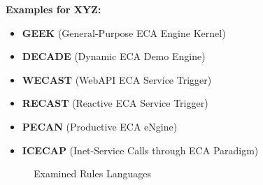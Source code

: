 \documentclass[11pt]{article}%
\begin{document}
\newpage




\textbf{Examples for XYZ:}
\begin{itemize}
  \item \textbf{GEEK} (General-Purpose ECA Engine Kernel)
  \item \textbf{DECADE} (Dynamic ECA Demo Engine)
  \item \textbf{WECAST} (WebAPI ECA Service Trigger)
  \item \textbf{RECAST} (Reactive ECA Service Trigger)
  \item \textbf{PECAN} (Productive ECA eNgine)
  \item \textbf{ICECAP} (Inet-Service Calls through ECA Paradigm)
\end{itemize}




\newpage
\begin{figure}[htb]
\centering
\caption{Examined Rules Languages}
\end{figure}

\end{document}
